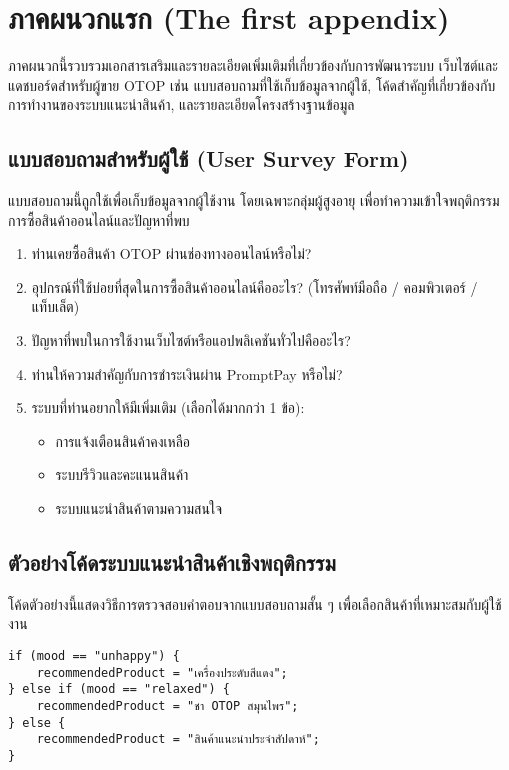 \chapter{ภาคผนวกแรก (The first appendix)}

ภาคผนวกนี้รวบรวมเอกสารเสริมและรายละเอียดเพิ่มเติมที่เกี่ยวข้องกับการพัฒนาระบบ
เว็บไซต์และแดชบอร์ดสำหรับผู้ขาย OTOP เช่น แบบสอบถามที่ใช้เก็บข้อมูลจากผู้ใช้,
โค้ดสำคัญที่เกี่ยวข้องกับการทำงานของระบบแนะนำสินค้า, และรายละเอียดโครงสร้างฐานข้อมูล

\section{แบบสอบถามสำหรับผู้ใช้ (User Survey Form)}
แบบสอบถามนี้ถูกใช้เพื่อเก็บข้อมูลจากผู้ใช้งาน โดยเฉพาะกลุ่มผู้สูงอายุ 
เพื่อทำความเข้าใจพฤติกรรมการซื้อสินค้าออนไลน์และปัญหาที่พบ

\begin{enumerate}
  \item ท่านเคยซื้อสินค้า OTOP ผ่านช่องทางออนไลน์หรือไม่?
  \item อุปกรณ์ที่ใช้บ่อยที่สุดในการซื้อสินค้าออนไลน์คืออะไร? 
        (โทรศัพท์มือถือ / คอมพิวเตอร์ / แท็บเล็ต)
  \item ปัญหาที่พบในการใช้งานเว็บไซต์หรือแอปพลิเคชันทั่วไปคืออะไร?
  \item ท่านให้ความสำคัญกับการชำระเงินผ่าน PromptPay หรือไม่?
  \item ระบบที่ท่านอยากให้มีเพิ่มเติม (เลือกได้มากกว่า 1 ข้อ): 
        \begin{itemize}
            \item การแจ้งเตือนสินค้าคงเหลือ
            \item ระบบรีวิวและคะแนนสินค้า
            \item ระบบแนะนำสินค้าตามความสนใจ
        \end{itemize}
\end{enumerate}

\section{ตัวอย่างโค้ดระบบแนะนำสินค้าเชิงพฤติกรรม}
โค้ดตัวอย่างนี้แสดงวิธีการตรวจสอบคำตอบจากแบบสอบถามสั้น ๆ 
เพื่อเลือกสินค้าที่เหมาะสมกับผู้ใช้งาน

\begin{verbatim}
if (mood == "unhappy") {
    recommendedProduct = "เครื่องประดับสีแดง";
} else if (mood == "relaxed") {
    recommendedProduct = "ชา OTOP สมุนไพร";
} else {
    recommendedProduct = "สินค้าแนะนำประจำสัปดาห์";
}
\end{verbatim}


